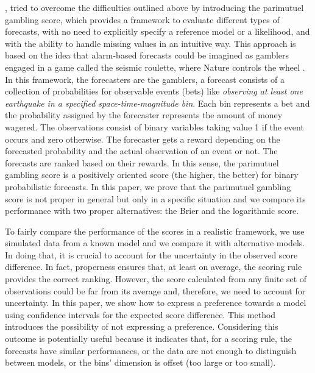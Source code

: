 \documentclass[referee,sn-basic]{sn-jnl}
\theoremstyle{thmstyleone}%
\theoremstyle{thmstyletwo}%
\theoremstyle{thmstylethree}%
\begin{document}
\cite{zhuang2010}, \cite{zechar2014} tried to overcome the difficulties outlined above by introducing the parimutuel gambling score, which provides a framework to evaluate different types of forecasts, with no need to explicitly specify a reference model or a likelihood, and with the ability to handle missing values in an intuitive way. This approach is based on the idea that alarm-based forecasts could be imagined as gamblers engaged in a game called the seismic roulette, where Nature controls the wheel \citep{main1997long,kossobokov2004earthquake,kossobokov2006testing}. In this framework, the forecasters are the gamblers, a forecast consists of a collection of probabilities for observable events (bets) like \emph{observing at least one earthquake in a specified space-time-magnitude bin}. Each bin represents a bet and the probability assigned by the forecaster represents the amount of money wagered. The observations consist of binary variables taking value 1 if the event occurs and zero otherwise. The forecaster gets a reward depending on the forecasted probability and the actual observation of an event or not. The forecasts are ranked based on their rewards. In this sense, the parimutuel gambling score is a positively oriented score (the higher, the better) for binary probabilistic forecasts. In this paper, we prove that the parimutuel gambling score is not proper in general but only in a specific situation and we compare its performance with two proper alternatives: the Brier \citep{brier1950verification} and the logarithmic \citep{goodj} score. 

To fairly compare the performance of the scores in a realistic framework, we use simulated data from a known model and we compare it with alternative models. In doing that, it is crucial to account for the uncertainty in the observed score difference. In fact, properness ensures that, at least on average, the scoring rule provides the correct ranking. However, the score calculated from any finite set of observations could be far from its average and, therefore, we need to account for uncertainty. In this paper, we show how to express a preference towards a model using confidence intervals for the expected score difference. This method introduces the possibility of not expressing a preference. Considering this outcome is potentially useful because it indicates that, for a scoring rule, the forecasts have similar performances, or the data are not enough to distinguish between models, or the bins' dimension is offset (too large or too small). 
\end{document}
